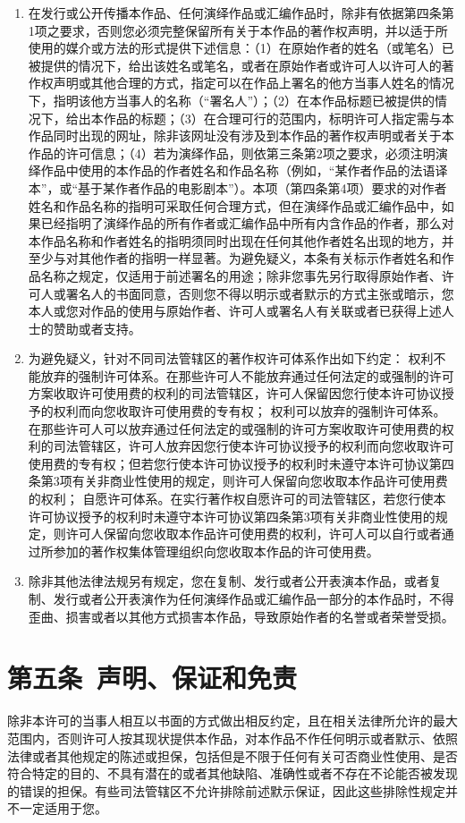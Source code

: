 \begin{enumerate}
	\item 在发行或公开传播本作品、任何演绎作品或汇编作品时，除非有依据第四条第1项之要求，否则您必须完整保留所有关于本作品的著作权声明，并以适于所使用的媒介或方法的形式提供下述信息：（1）在原始作者的姓名（或笔名）已被提供的情况下，给出该姓名或笔名，或者在原始作者或许可人以许可人的著作权声明或其他合理的方式，指定可以在作品上署名的他方当事人姓名的情况下，指明该他方当事人的名称（“署名人”）；（2）在本作品标题已被提供的情况下，给出本作品的标题；（3）在合理可行的范围内，标明许可人指定需与本作品同时出现的网址，除非该网址没有涉及到本作品的著作权声明或者关于本作品的许可信息；（4）若为演绎作品，则依第三条第2项之要求，必须注明演绎作品中使用的本作品的作者姓名和作品名称（例如，“某作者作品的法语译本”，或“基于某作者作品的电影剧本”）。本项（第四条第4项）要求的对作者姓名和作品名称的指明可采取任何合理方式，但在演绎作品或汇编作品中，如果已经指明了演绎作品的所有作者或汇编作品中所有内含作品的作者，那么对本作品名称和作者姓名的指明须同时出现在任何其他作者姓名出现的地方，并至少与对其他作者的指明一样显著。为避免疑义，本条有关标示作者姓名和作品名称之规定，仅适用于前述署名的用途；除非您事先另行取得原始作者、许可人或署名人的书面同意，否则您不得以明示或者默示的方式主张或暗示，您本人或您对作品的使用与原始作者、许可人或署名人有关联或者已获得上述人士的赞助或者支持。
	\item 为避免疑义，针对不同司法管辖区的著作权许可体系作出如下约定：
	\subitem 权利不能放弃的强制许可体系。在那些许可人不能放弃通过任何法定的或强制的许可方案收取许可使用费的权利的司法管辖区，许可人保留因您行使本许可协议授予的权利而向您收取许可使用费的专有权；
	\subitem 权利可以放弃的强制许可体系。在那些许可人可以放弃通过任何法定的或强制的许可方案收取许可使用费的权利的司法管辖区，许可人放弃因您行使本许可协议授予的权利而向您收取许可使用费的专有权；但若您行使本许可协议授予的权利时未遵守本许可协议第四条第3项有关非商业性使用的规定，则许可人保留向您收取本作品许可使用费的权利；
	\subitem 自愿许可体系。在实行著作权自愿许可的司法管辖区，若您行使本许可协议授予的权利时未遵守本许可协议第四条第3项有关非商业性使用的规定，则许可人保留向您收取本作品许可使用费的权利，许可人可以自行或者通过所参加的著作权集体管理组织向您收取本作品的许可使用费。
	\item 除非其他法律法规另有规定，您在复制、发行或者公开表演本作品，或者复制、发行或者公开表演作为任何演绎作品或汇编作品一部分的本作品时，不得歪曲、损害或者以其他方式损害本作品，导致原始作者的名誉或者荣誉受损。
\end{enumerate}
\section{第五条\ 声明、保证和免责}
除非本许可的当事人相互以书面的方式做出相反约定，且在相关法律所允许的最大范围内，否则许可人按其现状提供本作品，对本作品不作任何明示或者默示、依照法律或者其他规定的陈述或担保，包括但是不限于任何有关可否商业性使用、是否符合特定的目的、不具有潜在的或者其他缺陷、准确性或者不存在不论能否被发现的错误的担保。有些司法管辖区不允许排除前述默示保证，因此这些排除性规定并不一定适用于您。
